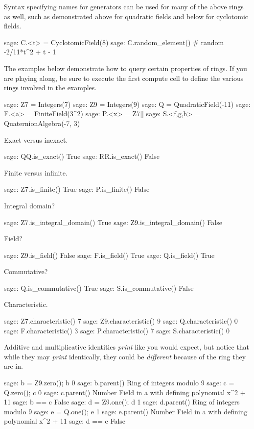 \par
%
Syntax specifying names for generators can be used for many of the above rings as well, such as demonstrated above for quadratic fields and below for cyclotomic fields.
%
\begin{sageexample}
sage: C.<t> = CyclotomicField(8)
sage: C.random_element()  # random
-2/11*t^2 + t - 1
\end{sageexample}
%
%
The examples below demonstrate how to query certain properties of rings.  If you are playing along, be sure to execute the first compute cell to define the various rings involved in the examples.
%
\begin{sageexample}
sage: Z7 = Integers(7)
sage: Z9 = Integers(9)
sage: Q = QuadraticField(-11)
sage: F.<a> = FiniteField(3^2)
sage: P.<x> = Z7[]
sage: S.<f,g,h> = QuaternionAlgebra(-7, 3)
\end{sageexample}
%
Exact versus inexact.
%
\begin{sageexample}
sage: QQ.is_exact()
True
sage: RR.is_exact()
False
\end{sageexample}
%
Finite versus infinite.
%
\begin{sageexample}
sage: Z7.is_finite()
True
sage: P.is_finite()
False
\end{sageexample}
%
Integral domain?
%
\begin{sageexample}
sage: Z7.is_integral_domain()
True
sage: Z9.is_integral_domain()
False
\end{sageexample}
%
Field?
%
\begin{sageexample}
sage: Z9.is_field()
False
sage: F.is_field()
True
sage: Q.is_field()
True
\end{sageexample}
%
Commutative?
%
\begin{sageexample}
sage: Q.is_commutative()
True
sage: S.is_commutative()
False
\end{sageexample}
%
Characteristic.
%
\begin{sageexample}
sage: Z7.characteristic()
7
sage: Z9.characteristic()
9
sage: Q.characteristic()
0
sage: F.characteristic()
3
sage: P.characteristic()
7
sage: S.characteristic()
0
\end{sageexample}
%
Additive and multiplicative identities \emph{print} like you would expect, but notice that while they may \emph{print} identically, they could be \emph{different} because of the ring they are in.
%
\begin{sageexample}
sage: b = Z9.zero(); b
0
sage: b.parent()
Ring of integers modulo 9
sage: c = Q.zero(); c
0
sage: c.parent()
Number Field in a with defining polynomial x^2 + 11
sage: b == c
False
sage: d = Z9.one(); d
1
sage: d.parent()
Ring of integers modulo 9
sage: e = Q.one(); e
1
sage: e.parent()
Number Field in a with defining polynomial x^2 + 11
sage: d == e
False
\end{sageexample}
